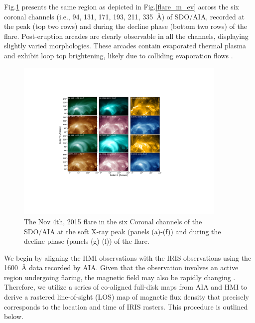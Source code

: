 Fig.\ref{flare_m_aia} presents the same region as depicted in Fig.\ref{flare_m_ev} across the six coronal channels (i.e., 94, 131, 171, 193, 211, 335~{\AA}) of SDO/AIA, recorded at the peak (top two rows) and during the decline phase (bottom two rows) of the flare. Post-eruption arcades \citep[][]{TriBC_2004} are clearly observable in all the channels, displaying slightly varied morphologies. These arcades contain evaporated thermal plasma and exhibit loop top brightening, likely due to colliding evaporation flows \citep[see, e.g.,][]{sharma16, patsourakos04}.

\begin{figure}[ht!]
    \begin{center}
        \includegraphics[trim={4.5cm 5.5cm 6cm 4cm},clip,width=0.9\textwidth]{Figures/nov_flare_aia_waves_2.pdf}
    \end{center}
    \caption{The Nov 4th, 2015 flare in the six Coronal channels of the SDO/AIA at the soft X-ray peak (panels (a)-(f)) and during the decline phase (panels (g)-(l)) of the flare.}
    \label{flare_m_aia}
\end{figure}

We begin by aligning the HMI observations with the IRIS observations using the 1600~{\AA} data recorded by AIA. Given that the observation involves an active region undergoing flaring, the magnetic field may also be rapidly changing \citep{wang02,dandan16,spirock02}. Therefore, we utilize a series of co-aligned full-disk maps from AIA and HMI to derive a rastered line-of-sight (LOS) map of magnetic flux density that precisely corresponds to the location and time of IRIS rasters. This procedure is outlined below.

